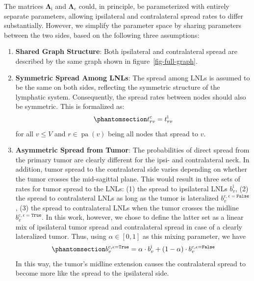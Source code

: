 \documentclass[
  sn-mathphys-num,
]{sn-jnl}
\providecommand{\tightlist}{%
  \setlength{\itemsep}{0pt}\setlength{\parskip}{0pt}}\usepackage{longtable,booktabs,array}
\begin{document}
The matrices \(\boldsymbol{\Lambda}_\text{i}\) and
\(\boldsymbol{\Lambda}_\text{c}\) could, in principle, be parameterized
with entirely separate parameters, allowing ipsilateral and
contralateral spread rates to differ substantially. However, we simplify
the parameter space by sharing parameters between the two sides, based
on the following three assumptions:

\begin{enumerate}
\def\labelenumi{\arabic{enumi}.}
\tightlist
\item
  \textbf{Shared Graph Structure}: Both ipsilateral and contralateral
  spread are described by the same graph shown in
  figure~\ref{fig-full-graph}.
\item
  \textbf{Symmetric Spread Among LNLs}: The spread among LNLs is assumed
  to be the same on both sides, reflecting the symmetric structure of
  the lymphatic system. Consequently, the spread rates between nodes
  should also be symmetric. This is formalized as:\\
  \begin{equation}\phantomsection\label{eq-symmetries}{
    t_{rv}^\text{c} = t_{rv}^\text{i}
    }\end{equation} for all \(v \leq V\) and
  \(r \in \operatorname{pa}(v)\) being all nodes that spread to \(v\).
\item
  \textbf{Asymmetric Spread from Tumor}: The probabilities of direct
  spread from the primary tumor are clearly different for the ipsi- and
  contralateral neck. In addition, tumor spread to the contralateral
  side varies depending on whether the tumor crosses the mid-sagittal
  plane. This would result in three sets of rates for tumor spread to
  the LNLs: (1) the spread to ipsilateral LNLs \(b^\text{i}_v\), (2) the
  spread to contralateral LNLs as long as the tumor is lateralized
  \(b_v^{\text{c},\epsilon=\texttt{False}}\), (3) the spread to
  contralateral LNLs when the tumor crosses the midline
  \(b_v^{\text{c},\epsilon=\texttt{True}}\). In this work, however, we
  chose to define the latter set as a linear mix of ipsilateral tumor
  spread and contralateral spread in case of a clearly lateralized
  tumor. Thus, using \(\alpha \in [0,1]\) as this mixing parameter, we
  have \begin{equation}\phantomsection\label{eq-mixing}{
    b_v^{\text{c},\epsilon=\texttt{True}} = \alpha \cdot b_v^\text{i} + (1 - \alpha) \cdot b_v^{\text{c},\epsilon=\texttt{False}}
    }\end{equation} In this way, the tumor's midline extension causes
  the contralateral spread to become more like the spread to the
  ipsilateral side.
\end{enumerate}
\end{document}

